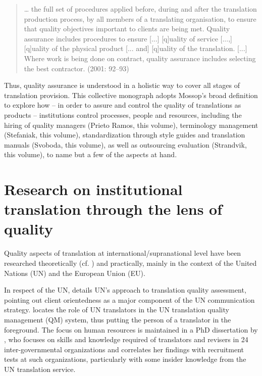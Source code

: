 \documentclass[output=paper]{langsci/langscibook}
\begin{document}
\begin{quote}
… the full set of procedures applied before, during and after the translation production process, by all members of a translating organisation, to ensure that quality objectives important to clients are being met. Quality assurance includes procedures to ensure [...] [q]uality of service [...,] [q]uality of the physical product [... and] [q]uality of the translation. [...] Where work is being done on contract, quality assurance includes selecting the best contractor. (2001: 92--93)
\end{quote}


Thus, quality assurance is understood in a holistic way to cover all stages of translation provision. This collective monograph adopts Mossop’s broad definition to explore how – in order to assure and control the quality of translations as products – institutions control processes, people and resources, including the hiring of quality managers (Prieto Ramos, this volume), terminology management (Stefaniak, this volume), standardization through style guides and translation manuals (Svoboda, this volume), as well as outsourcing evaluation (Strandvik, this volume), to name but a few of the aspects at hand. 

\section{Research on institutional translation through the lens of quality}

Quality aspects of translation at international/supranational level have been researched theoretically (cf. \citealt{PrietoRamos2015,PrietoRamos2015}) and practically, mainly in the context of the United Nations (UN) and the European Union (EU).

In respect of the UN,  \citet{DeSaintRobert2009} details UN’s approach to translation quality assessment, pointing out client orientedness as a major component of the UN communication strategy. \citet{Didaoui2009} locates the role of UN translators in the UN translation quality management (QM) system, thus putting the person of a translator in the foreground. The focus on human resources is maintained in a PhD dissertation by \citet{Lafeber2012}, who focuses on skills and knowledge required of translators and revisers in 24 inter-governmental organizations and correlates her findings with recruitment tests at such organizations, particularly with some insider knowledge from the UN translation service.
\end{document}
